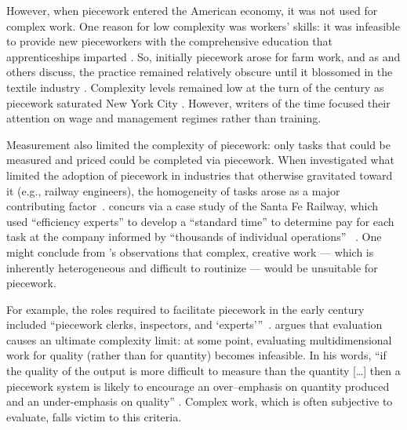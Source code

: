 \documentclass[trackingWork]{subfiles}
\begin{document}
However, when piecework entered the American economy,
it was not used for complex work.
One reason for low complexity was workers' skills: it was infeasible to provide new pieceworkers with the comprehensive education
that apprenticeships imparted \cite{hart2013rise}.
So, initially piecework arose for farm work, and as
\citeauthor{hughRaynbirdTaskWork} and others discuss,
the practice remained relatively obscure until
it blossomed in the textile industry
\cite{hughRaynbirdTaskWork}.
Complexity levels remained low at the turn of
the  century as piecework saturated New York City
\cite{riisOtherSideLives}.
However, writers of the time focused their attention on
wage \cite{burton1899commercial} and
management regimes \cite{norton1900textile}
rather than training.


Measurement also limited the complexity of piecework:
only tasks that could be measured and priced could be completed via piecework. 
When \citeauthor{Brown01041990} investigated
what limited the adoption of piecework in industries that otherwise gravitated toward it
(e.g., railway engineers),
the homogeneity of tasks arose as a major contributing factor~\cite{Brown01041990}.
\citeauthor{10.2307/23702539} concurs via a case study of the Santa Fe Railway,
which used ``efficiency experts'' to develop a ``standard time''
to determine pay for each task at the company informed by
``thousands of individual operations''%
~\cite{10.2307/23702539}.
One might conclude from \citeauthor{10.2307/23702539}'s observations that
complex, creative work
--- which is inherently heterogeneous and difficult to routinize ---
would be unsuitable for piecework.

For example, the roles required to facilitate piecework in the early  century included ``piecework clerks, inspectors, and `experts'''~\cite{10.2307/23702539}.
\citeauthor{hart2016rise} argues that evaluation causes an ultimate complexity limit:
at some point, evaluating multidimensional work for quality
(rather than for quantity) becomes infeasible.
In his words,
``if the quality of the output is more difficult to measure than the quantity [\ldots]
then a piecework system is likely to encourage
an over--emphasis on quantity produced and an under-emphasis on quality''
\cite{hart2016rise}.
Complex work, which is often subjective to evaluate, falls victim to this criteria.
\end{document}
